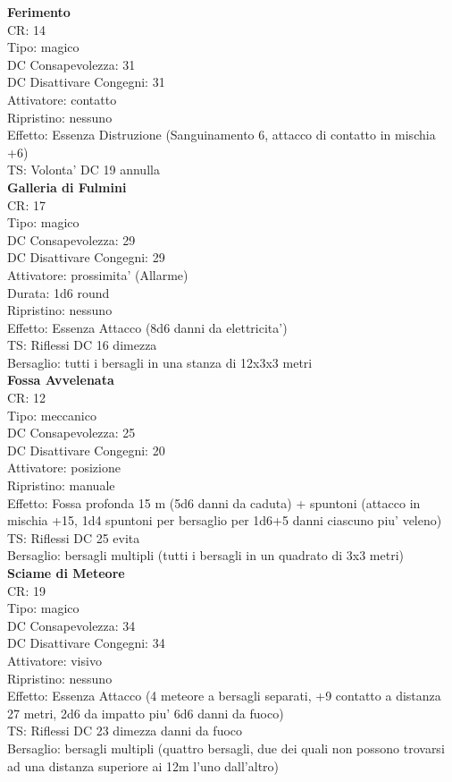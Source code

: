 \documentclass[a4paper,11pt,twoside,openany]{book}
\begin{document}
{\begin{multicols}{2}
\textbf{Ferimento}\\
CR: 14 \\
Tipo: magico \\
DC Consapevolezza: 31 \\
DC Disattivare Congegni: 31 \\
Attivatore: contatto \\
Ripristino: nessuno \\
Effetto: Essenza Distruzione (Sanguinamento 6, attacco di contatto in mischia +6)\\
TS: Volonta' DC 19 annulla\\

\textbf{Galleria di Fulmini}\\
CR: 17 \\
Tipo: magico \\
DC Consapevolezza: 29 \\
DC Disattivare Congegni: 29 \\
Attivatore: prossimita' (Allarme) \\
Durata: 1d6 round \\
Ripristino: nessuno \\
Effetto: Essenza Attacco (8d6 danni da elettricita') \\
TS: Riflessi DC 16 dimezza \\
Bersaglio: tutti i bersagli in una stanza di 12x3x3 metri\\

\textbf{Fossa Avvelenata}\\
CR: 12 \\
Tipo: meccanico \\
DC Consapevolezza: 25 \\
DC Disattivare Congegni: 20 \\
Attivatore: posizione \\
Ripristino: manuale \\
Effetto: Fossa profonda 15 m (5d6 danni da caduta) + spuntoni (attacco in mischia +15, 1d4 spuntoni per bersaglio per 1d6+5 danni ciascuno piu' veleno)\\
TS: Riflessi DC 25 evita \\
Bersaglio: bersagli multipli (tutti i bersagli in un quadrato di 3x3 metri)\\

\textbf{Sciame di Meteore}\\
CR: 19 \\
Tipo: magico \\
DC Consapevolezza: 34 \\
DC Disattivare Congegni: 34 \\
Attivatore: visivo\\
Ripristino: nessuno \\
Effetto: Essenza Attacco (4 meteore a bersagli separati, +9 contatto a distanza 27 metri, 2d6 da impatto piu' 6d6 danni da fuoco)\\
TS: Riflessi DC 23 dimezza danni da fuoco\\
Bersaglio: bersagli multipli (quattro bersagli, due dei quali non possono trovarsi ad una distanza superiore ai 12m l’uno dall’altro)\\


\end{multicols}}
\end{document}
